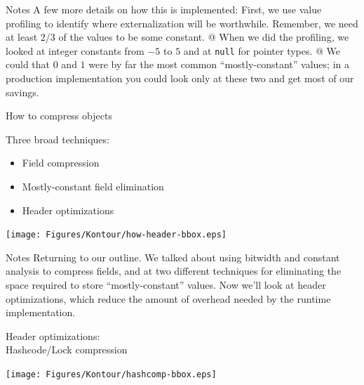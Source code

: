 \documentclass[%
pdf,
colorBG,
slideColor,
nototal,
oqe
]{prosper}
\renewcommand{\yellow}{\colC}
\newenvironment{talknotes}{\begin{slide}{Notes}\tiny}{\end{slide}}
\begin{document}
\begin{talknotes}
A few more details on how this is implemented:
First, we use value profiling to identify where externalization will
be worthwhile.  Remember, we need at least 2/3 of the values to be
some constant.  @ When we did the profiling, we looked at integer
constants from $-5$ to $5$ and at {\tt null} for pointer types.
@ We could that $0$ and $1$ were by far the most common
``mostly-constant'' values;  in a production implementation you
could look only at these two and get most of our savings.
\end{talknotes}

\begin{slide}{How to compress objects} %

Three broad techniques:

\parbox[b]{2.5in}{%
\begin{itemize}%
\lightgray\renewcommand{\green}{\lightgray}%
\item Field compression
\lightgray\renewcommand{\green}{\lightgray}%
\item Mostly-constant field elimination
\headeropt\renewcommand{\green}{\headeropt}%
\item Header optimizations
\renewcommand{\green}{\yellow} %
\end{itemize}
}%
\parbox[b]{1.75in}{%
\texttt{[image: Figures/Kontour/how-header-bbox.eps]}%
}%
\end{slide}

\begin{talknotes}
Returning to our outline.  We talked about using bitwidth and constant
analysis to compress fields, and at two different techniques for
eliminating the space required to store ``mostly-constant'' values.
Now we'll look at header optimizations, which reduce the amount of
overhead needed by the runtime implementation.
\end{talknotes}

\begin{slide}{Header optimizations:\\\small Hashcode/Lock compression}
\begin{center}
\vspace{.5cm}
\texttt{[image: Figures/Kontour/hashcomp-bbox.eps]}
\end{center}
\end{slide}
\end{document}
